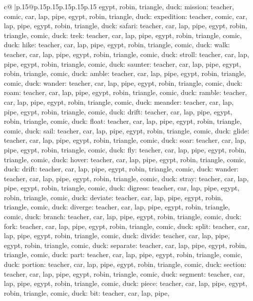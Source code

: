 \documentclass{article}
\begin{document}
{\begin{supertabular}{c@{$\;$}|p{.15\linewidth}@{}p{.15\linewidth}p{.15\linewidth}p{.15\linewidth}p{.15\linewidth}p{.15\linewidth}}
{{{egypt, robin, triangle, duck\n\nCLUE: mission\nTARGETS: teacher, comic, car, lap, pipe, egypt, robin, triangle, duck\n\nCLUE: expedition\nTARGETS: teacher, comic, car, lap, pipe, egypt, robin, triangle, duck\n\nCLUE: safari\nTARGETS: teacher, car, lap, pipe, egypt, robin, triangle, comic, duck\n\nCLUE: trek\nTARGETS: teacher, car, lap, pipe, egypt, robin, triangle, comic, duck\n\nCLUE: hike\nTARGETS: teacher, car, lap, pipe, egypt, robin, triangle, comic, duck\n\nCLUE: walk\nTARGETS: teacher, car, lap, pipe, egypt, robin, triangle, comic, duck\n\nCLUE: stroll\nTARGETS: teacher, car, lap, pipe, egypt, robin, triangle, comic, duck\n\nCLUE: saunter\nTARGETS: teacher, car, lap, pipe, egypt, robin, triangle, comic, duck\n\nCLUE: amble\nTARGETS: teacher, car, lap, pipe, egypt, robin, triangle, comic, duck\n\nCLUE: wander\nTARGETS: teacher, car, lap, pipe, egypt, robin, triangle, comic, duck\n\nCLUE: roam\nTARGETS: teacher, car, lap, pipe, egypt, robin, triangle, comic, duck\n\nCLUE: ramble\nTARGETS: teacher, car, lap, pipe, egypt, robin, triangle, comic, duck\n\nCLUE: meander\nTARGETS: teacher, car, lap, pipe, egypt, robin, triangle, comic, duck\n\nCLUE: drift\nTARGETS: teacher, car, lap, pipe, egypt, robin, triangle, comic, duck\n\nCLUE: float\nTARGETS: teacher, car, lap, pipe, egypt, robin, triangle, comic, duck\n\nCLUE: sail\nTARGETS: teacher, car, lap, pipe, egypt, robin, triangle, comic, duck\n\nCLUE: glide\nTARGETS: teacher, car, lap, pipe, egypt, robin, triangle, comic, duck\n\nCLUE: soar\nTARGETS: teacher, car, lap, pipe, egypt, robin, triangle, comic, duck\n\nCLUE: fly\nTARGETS: teacher, car, lap, pipe, egypt, robin, triangle, comic, duck\n\nCLUE: hover\nTARGETS: teacher, car, lap, pipe, egypt, robin, triangle, comic, duck\n\nCLUE: drift\nTARGETS: teacher, car, lap, pipe, egypt, robin, triangle, comic, duck\n\nCLUE: wander\nTARGETS: teacher, car, lap, pipe, egypt, robin, triangle, comic, duck\n\nCLUE: stray\nTARGETS: teacher, car, lap, pipe, egypt, robin, triangle, comic, duck\n\nCLUE: digress\nTARGETS: teacher, car, lap, pipe, egypt, robin, triangle, comic, duck\n\nCLUE: deviate\nTARGETS: teacher, car, lap, pipe, egypt, robin, triangle, comic, duck\n\nCLUE: diverge\nTARGETS: teacher, car, lap, pipe, egypt, robin, triangle, comic, duck\n\nCLUE: branch\nTARGETS: teacher, car, lap, pipe, egypt, robin, triangle, comic, duck\n\nCLUE: fork\nTARGETS: teacher, car, lap, pipe, egypt, robin, triangle, comic, duck\n\nCLUE: split\nTARGETS: teacher, car, lap, pipe, egypt, robin, triangle, comic, duck\n\nCLUE: divide\nTARGETS: teacher, car, lap, pipe, egypt, robin, triangle, comic, duck\n\nCLUE: separate\nTARGETS: teacher, car, lap, pipe, egypt, robin, triangle, comic, duck\n\nCLUE: part\nTARGETS: teacher, car, lap, pipe, egypt, robin, triangle, comic, duck\n\nCLUE: portion\nTARGETS: teacher, car, lap, pipe, egypt, robin, triangle, comic, duck\n\nCLUE: section\nTARGETS: teacher, car, lap, pipe, egypt, robin, triangle, comic, duck\n\nCLUE: segment\nTARGETS: teacher, car, lap, pipe, egypt, robin, triangle, comic, duck\n\nCLUE: piece\nTARGETS: teacher, car, lap, pipe, egypt, robin, triangle, comic, duck\n\nCLUE: bit\nTARGETS: teacher, car, lap, pipe, }}}
\end{supertabular}}
\end{document}
